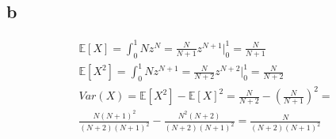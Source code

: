\documentclass[10pt,letterpaper]{paper}
\begin{document}
\subsection*{b}

\begin{align*}
  \mathbb{E}[X] = \int_0^1 N z^N = \frac{N}{N+1} z^{N+1} \big |_0^1 = \frac{N}{N+1}\\
  \mathbb{E}[X^2] = \int_0^1 N z^{N+1} = \frac{N}{N+2} z^{N+2} \big |_0^1 = \frac{N}{N+2}\\
  Var(X) = \mathbb{E}[X^2] - \mathbb{E}[X]^2 = \frac{N}{N+2}-(\frac{N}{N+1})^2 =\\
  \frac{N(N+1)^2}{(N+2)(N+1)^2} - \frac{N^2(N+2)}{(N+2)(N+1)^2} = \frac{N}{(N+2)(N+1)^2}
\end{align*}
\end{document}
